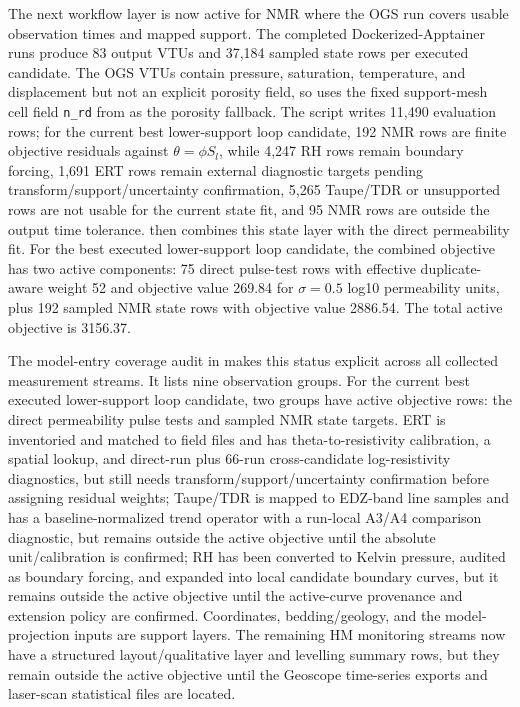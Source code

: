 The next workflow layer is now active for NMR where the OGS run covers usable
observation times and mapped support.  The completed Dockerized-Apptainer runs
produce 83 output VTUs and 37,184 sampled state rows per executed candidate.  The OGS
VTUs contain pressure, saturation, temperature, and displacement but not an explicit
porosity field, so  uses the fixed support-mesh
cell field \texttt{n\_rd} from  as the porosity fallback.
The script  writes 11,490 evaluation rows;
for the current best lower-support loop candidate, 192 NMR rows are finite objective residuals
against \(\theta=\phi S_l\), while 4,247 RH rows remain boundary forcing, 1,691 ERT
rows remain external diagnostic targets pending transform/support/uncertainty
confirmation, 5,265 Taupe/TDR or unsupported rows are not usable for the current state
fit, and 95 NMR rows are outside the output time tolerance.
 then combines this state layer with the direct
permeability fit.  For the best executed lower-support loop candidate, the combined
objective has two active components: 75 direct pulse-test rows with effective
duplicate-aware weight 52 and objective value 269.84 for \(\sigma=0.5\) log10
permeability units, plus 192 sampled NMR state rows with objective value 2886.54.
The total active objective is 3156.37.

The model-entry coverage audit in
 makes this status explicit
across all collected measurement streams.  It lists nine observation groups.  For the
current best executed lower-support loop candidate, two groups have active objective rows:
the direct permeability pulse tests and sampled NMR state targets.  ERT is inventoried
and matched to field files and has theta-to-resistivity calibration, a spatial lookup,
and direct-run plus 66-run cross-candidate log-resistivity diagnostics, but still
needs transform/support/uncertainty confirmation before assigning residual weights;
Taupe/TDR is mapped to EDZ-band line samples and has a
baseline-normalized trend operator with a run-local A3/A4 comparison diagnostic, but
remains outside the active objective until the absolute unit/calibration is confirmed;
RH has been converted to Kelvin pressure, audited as boundary forcing, and expanded
into local candidate boundary curves, but it remains outside the active objective
until the active-curve provenance and extension policy are confirmed.  Coordinates,
bedding/geology, and the model-projection inputs are support layers.  The remaining HM
monitoring streams now have a structured layout/qualitative layer and levelling summary
rows, but they remain outside the active objective until the Geoscope time-series
exports and laser-scan statistical files are located.

